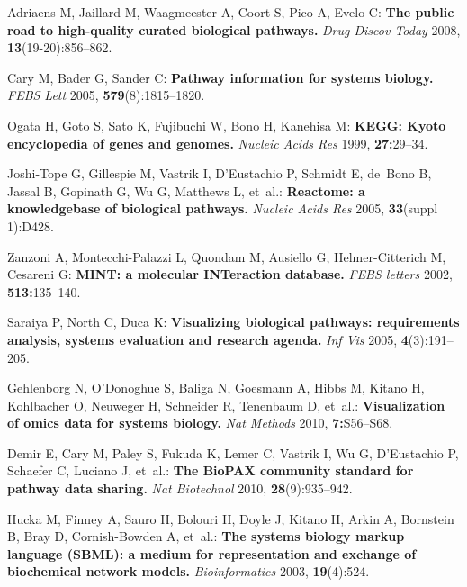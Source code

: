 \documentclass[11pt]{bmc_article_s50}
\begin{document}
\begin{thebibliography}{10}
\providecommand{\url}[1]{[#1]}
\providecommand{\urlprefix}{}

Adriaens M, Jaillard M, Waagmeester A, Coort S, Pico A, Evelo C: \textbf{The
  public road to high-quality curated biological pathways.} \emph{Drug Discov Today} 2008, \textbf{13}(19-20):856--862.

Cary M, Bader G, Sander C: \textbf{Pathway information for systems biology.}
  \emph{FEBS Lett} 2005, \textbf{579}(8):1815--1820.

Ogata H, Goto S, Sato K, Fujibuchi W, Bono H, Kanehisa M: \textbf{KEGG: Kyoto
  encyclopedia of genes and genomes.} \emph{Nucleic Acids Res} 1999,
  \textbf{27:}29--34.

Joshi-Tope G, Gillespie M, Vastrik I, D'Eustachio P, Schmidt E, de~Bono B,
  Jassal B, Gopinath G, Wu G, Matthews L, et~al.: \textbf{Reactome: a
  knowledgebase of biological pathways.} \emph{Nucleic Acids Res} 2005,
  \textbf{33}(suppl 1):D428.

Zanzoni A, Montecchi-Palazzi L, Quondam M, Ausiello G, Helmer-Citterich M,
  Cesareni G: \textbf{MINT: a molecular INTeraction database.} \emph{FEBS
  letters} 2002, \textbf{513:}135--140.

Saraiya P, North C, Duca K: \textbf{Visualizing biological pathways:
  requirements analysis, systems evaluation and research agenda.}
  \emph{Inf Vis} 2005, \textbf{4}(3):191--205.

Gehlenborg N, O'Donoghue S, Baliga N, Goesmann A, Hibbs M, Kitano H, Kohlbacher
  O, Neuweger H, Schneider R, Tenenbaum D, et~al.: \textbf{Visualization of
  omics data for systems biology.} \emph{Nat Methods} 2010,
  \textbf{7:}S56--S68.

Demir E, Cary M, Paley S, Fukuda K, Lemer C, Vastrik I, Wu G, D'Eustachio P,
  Schaefer C, Luciano J, et~al.: \textbf{The BioPAX community standard for
  pathway data sharing.} \emph{Nat Biotechnol} 2010,
  \textbf{28}(9):935--942.

Hucka M, Finney A, Sauro H, Bolouri H, Doyle J, Kitano H, Arkin A, Bornstein B,
  Bray D, Cornish-Bowden A, et~al.: \textbf{The systems biology markup language
  (SBML): a medium for representation and exchange of biochemical network
  models.} \emph{Bioinformatics} 2003, \textbf{19}(4):524.


\end{thebibliography}
\end{document}
